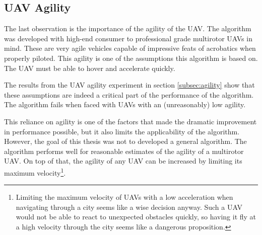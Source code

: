 \subsection{UAV Agility} 
The last observation is the importance of the agility of the UAV. The algorithm was developed with high-end consumer to professional grade multirotor UAVs in mind. These are very agile vehicles capable of impressive feats of acrobatics when properly piloted. This agility is one of the assumptions this algorithm is based on. The UAV must be able to hover and accelerate quickly.
\par
The results from the UAV agility experiment in section \ref{subsec:agility} show that these assumptions are indeed a critical part of the performance of the algorithm. The algorithm fails when faced with UAVs with an (unreasonably) low agility. 
\par
This reliance on agility is one of the factors that made the dramatic improvement in performance possible, but it also limits the applicability of the algorithm. However, the goal of this thesis was not to developed a general algorithm. The algorithm performs well for reasonable estimates of the agility of a multirotor UAV. On top of that, the agility of any UAV can be increased by limiting its maximum velocity\footnote{Limiting the maximum velocity of UAVs with a low acceleration when navigating through a city seems like a wise decision anyway. Such a UAV would not be able to react to unexpected obstacles quickly, so having it fly at a high velocity through the city seems like a dangerous proposition.}.



